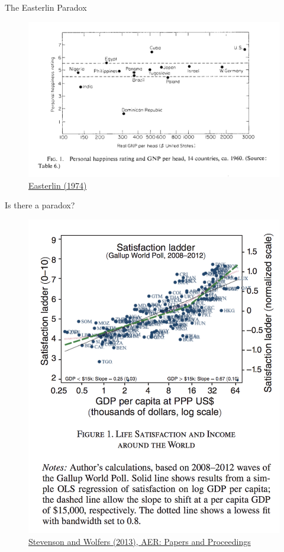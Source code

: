 \documentclass[handout]{beamer}
\begin{document}
\begin{frame}{The Easterlin Paradox}

\begin{figure}
\centering
\includegraphics[scale=0.3]{easterlin.png}
\caption{\href{http://graphics8.nytimes.com/images/2008/04/16/business/Easterlin1974.pdf}{Easterlin (1974)}}
\end{figure}

\end{frame}


\begin{frame}{Is there a paradox?}

\begin{figure}
\centering
\includegraphics[scale=0.3]{wolfers.png}
\caption{\href{http://users.nber.org/~jwolfers/papers/Satiation(AER).pdf}{Stevenson and Wolfers (2013), AER: Papers and Proceedings}
}
\end{figure}

\end{frame}
\end{document}
